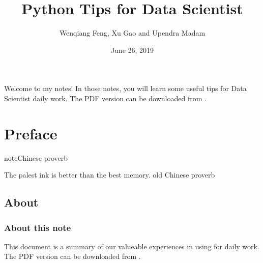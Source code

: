 \documentclass[letterpaper,12pt,english]{sphinxmanual}
\title{Python Tips for Data Scientist}
\date{June 26, 2019}
\author{Wenqiang Feng, Xu Gao and Upendra Madam}
\begin{document}
\pagestyle{empty}
\maketitle
\pagestyle{plain}
\sphinxtableofcontents
\pagestyle{normal}
\label{\detokenize{index::doc}}\label{\detokenize{index:index}}\begin{quote}

\begin{figure}[htbp]
\centering

\noindent{}
\end{figure}
\end{quote}

Welcome to my  notes! In those notes, you will learn some useful tips for Data Scientist daily work. The PDF version can be downloaded from .




\chapter{Preface}
\label{\detokenize{preface:preface}}\label{\detokenize{preface:id1}}\label{\detokenize{preface::doc}}
\begin{sphinxadmonition}{note}{Chinese proverb}

The palest ink is better than the best memory. \textendash{} old Chinese proverb
\end{sphinxadmonition}


\section{About}
\label{\detokenize{preface:about}}

\subsection{About this note}
\label{\detokenize{preface:about-this-note}}
This document is a summary of our valueable experiences in using 
for  daily work. The PDF version can be downloaded from .

\end{document}
